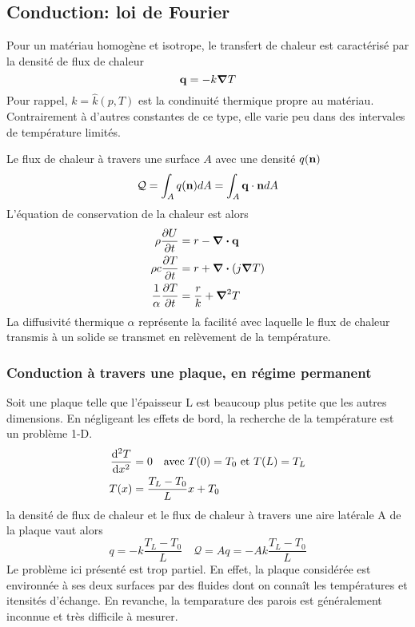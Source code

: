 \documentclass[a4paper,11pt]{report}
\newcommand{\recip}[1]{\frac{1}{#1}}
\begin{document}
    \subsection{Conduction: loi de Fourier}
      Pour un matériau homogène et isotrope, le transfert de chaleur est caractérisé par la densité de flux de chaleur
      \begin{equation}
        \vb{q} = - k \grad T
      \end{equation}
      Pour rappel, $k = \hat{k}(p, T)$ est la condinuité thermique propre au matériau. Contrairement à d'autres constantes de ce type, elle varie peu dans des intervales de température limités.

      Le flux de chaleur à travers une surface $A$ avec une densité $q(\vb{n})$
      \begin{equation}
        \mathcal{Q} = \int_A q(\vb{n}) dA = \int_A \vb{q} \cdot \vb{n} dA
      \end{equation}
      L'équation de conservation de la chaleur est alors
      \begin{equation}
        \begin{aligned}
          \rho \pdv{U}{t} &= r - \div \vb{q}\\
          \rho c \pdv{T}{t} &= r +  \div (j \grad T)\\
          \recip{\alpha} \pdv{T}{t} &= \frac{r}{k} + \grad^2 T
        \end{aligned}
      \end{equation}
      La diffusivité thermique $\alpha$ représente la facilité avec laquelle le flux de chaleur transmis à un solide se transmet en relèvement de la température.

      \subsubsection{Conduction à travers une plaque, en régime permanent}
        Soit une plaque telle que l'épaisseur L est beaucoup plus petite que les autres dimensions. En négligeant les effets de bord, la recherche de la température est un problème 1-D.
        \begin{equation}
          \begin{aligned}
            \dv[2]{T}{x} &= 0 \quad \textrm{avec } T(0) = T_0 \textrm{ et } T(L) = T_L\\
            T(x) &= \frac{T_L - T_0}{L} x + T_0
          \end{aligned}
        \end{equation}
        la densité de flux de chaleur et le flux de chaleur à travers une aire latérale A de la plaque vaut alors
        \begin{equation}
          q = -k \frac{T_L - T_0}{L} \quad \mathcal{Q} = Aq = -A k \frac{T_L - T_0}{L}
        \end{equation}
        Le problème ici présenté est trop partiel. En effet, la plaque considérée est environnée à ses deux surfaces par des fluides dont on connaît les températures et itensités d'échange. En revanche, la temparature des parois est généralement inconnue et très difficile à mesurer.
\end{document}
